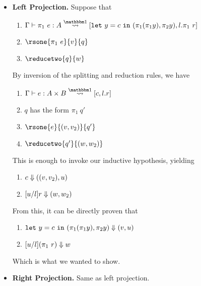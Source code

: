 \documentclass{article}
\begin{document}
\begin{itemize}
\item {\bf Left Projection.} Suppose that
\begin{enumerate}
\item $\splitone {\pi_1~e}{A}{\letin{y}{c}{(\pi_1(\pi_1 y),\pi_2 y)},l.\pi_1~r}$
\item $\rsone{\pi_1~e}{v}{q}$
\item $\reducetwo{q}{w}$
\end{enumerate}
By inversion of the splitting and reduction rules, we have
\begin{enumerate}
\item $\splitone {e}{A \times B}{c,l.r}$
\item $q$ has the form $\pi_1~q'$
\item $\rsone{e}{\valprod{v}{v_2}}{q'}$
\item $\reducetwo{q'}{\valprod{w}{w_2}}$
\end{enumerate}
This is enough to invoke our inductive hypothesis, yielding
\begin{enumerate}
\item ${c} \Downarrow {({({v},{v_2})},{u})}$
\item ${[u/l]r} \Downarrow {({w},{w_2})}$
\end{enumerate}
From this, it can be directly proven that
\begin{enumerate}
\item ${{\tt let}~{y} = {c}~{\tt in}~{(\pi_1(\pi_1 y),\pi_2 y)}} \Downarrow {({v},{u})}$
\item ${[u/l](\pi_1~r)} \Downarrow {w}$
\end{enumerate}
Which is what we wanted to show.

\item {\bf Right Projection.} Same as left projection.


\end{itemize}
\end{document}
